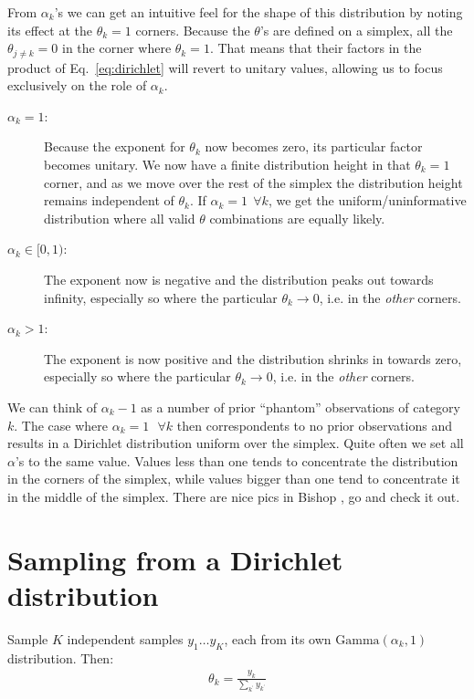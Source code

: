 \documentclass[oneside,english]{scrbook}
\begin{document}
From $\alpha_k$'s we can get an intuitive feel for the shape of this
distribution by noting its effect at the $\theta_k=1$ corners. Because
the $\theta$'s are defined on a simplex, all the $\theta_{j\neq k}=0$
in the corner where $\theta_k=1$. That means that their factors in the
product of Eq.~\ref{eq:dirichlet} will revert to unitary values,
allowing us to focus exclusively on the role of $\alpha_k$.
\begin{description}
  \item[$\alpha_k = 1$:] Because the exponent for $\theta_k$ now
    becomes zero, its particular factor becomes unitary. We now have a
    finite distribution height in that $\theta_k=1$ corner, and as we
    move over the rest of the simplex the distribution height remains
    independent of $\theta_k$. If $\alpha_k =1 ~~ \forall k$, we get the
    uniform/uninformative distribution where all valid $\theta$
    combinations are equally likely.
  \item [$\alpha_k \in [0,1)$:] The exponent now is negative and the
    distribution peaks out towards infinity, especially so where the
    particular $\theta_k \rightarrow 0$, i.e. in the \emph{other}
    corners.
  \item[$\alpha_k > 1$:] The exponent is now positive and the
    distribution shrinks in towards zero, especially so where the
    particular $\theta_k \rightarrow 0$, i.e. in the \emph{other}
    corners.
\end{description}

We can think of $\alpha_k-1$ as a number of prior ``phantom''
observations of category $k$. The case where $\alpha_k=1 \mbox{~~}
\forall k$ then correspondents to no prior observations and results in
a Dirichlet distribution uniform over the simplex. Quite often we set
all $\alpha$'s to the same value. Values less than one tends to
concentrate the distribution in the corners of the simplex, while
values bigger than one tend to concentrate it in the middle of the
simplex. There are nice pics in Bishop \cite[Section
  2.2.1]{Bishop2006}, go and check it out.

\section{Sampling from a Dirichlet distribution}
Sample $K$ independent samples $y_1 \ldots y_K$, each from its own
$\text{Gamma}(\alpha_k,1)$ distribution. Then:
\begin{align*}
  \theta_k = \frac{y_k} {\sum_{k^{'}}y_{k^{'}}}
\end{align*}
\end{document}
